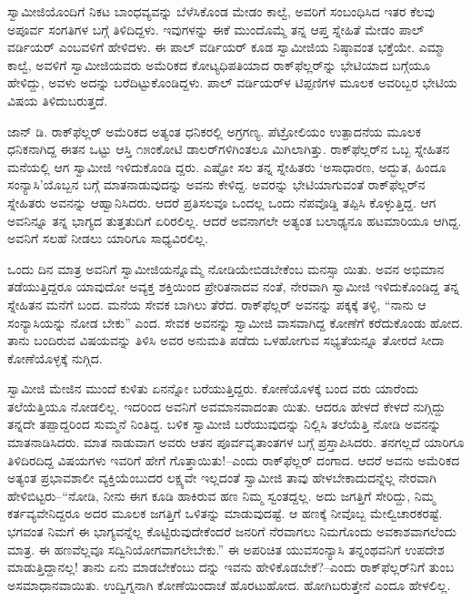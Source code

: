 ಸ್ವಾಮೀಜಿಯೊಂದಿಗೆ ನಿಕಟ ಬಾಂಧವ್ಯವನ್ನು ಬೆಳೆಸಿಕೊಂಡ ಮೇಡಂ ಕಾಲ್ವೆ, ಅವರಿಗೆ ಸಂಬಂಧಿಸಿದ ಇತರ ಕೆಲವು ಅಪೂರ್ವ ಸಂಗತಿಗಳ ಬಗ್ಗೆ ತಿಳಿದಿದ್ದಳು. ಇವುಗಳನ್ನು ಈಕೆ ಮುಂದೊಮ್ಮೆ ತನ್ನ ಆಪ್ತ ಸ್ನೇಹಿತೆ ಮೇಡಂ ಪಾಲ್ ವರ್ಡಿಯರ್ ಎಂಬವಳಿಗೆ ಹೇಳಿದಳು. ಈ ಪಾಲ್ ವರ್ಡಿಯರ್ ಕೂಡ ಸ್ವಾಮೀಜಿಯ ನಿಷ್ಠಾವಂತ ಭಕ್ತೆಯೇ. ಎಮ್ಮಾ ಕಾಲ್ವೆ, ಅವಳಿಗೆ ಸ್ವಾಮೀಜಿಯವರು ಅಮೆರಿಕದ ಕೋಟ್ಯಧಿಪತಿಯಾದ ರಾಕ್​ಫೆಲ್ಲರ್​ನ್ನು ಭೇಟಿಯಾದ ಬಗ್ಗೆಯೂ ಹೇಳಿದ್ದು, ಅವಳು ಅದನ್ನು ಬರೆದಿಟ್ಟುಕೊಂಡಿದ್ದಳು. ಪಾಲ್ ವರ್ಡಿಯರ್​ಳ ಟಿಪ್ಪಣಿಗಳ ಮೂಲಕ ಅವರಿಬ್ಬರ ಭೇಟಿಯ ವಿಷಯ ತಿಳಿದುಬರುತ್ತದೆ.

ಜಾನ್ ಡಿ. ರಾಕ್​ಫೆಲ್ಲರ್ ಅಮೆರಿಕದ ಅತ್ಯಂತ ಧನಿಕರಲ್ಲಿ ಅಗ್ರಗಣ್ಯ. ಪೆಟ್ರೋಲಿಯಂ ಉತ್ಪಾದನೆಯ ಮೂಲಕ ಧನಿಕನಾಗಿದ್ದ ಈತನ ಒಟ್ಟು ಆಸ್ತಿ ೧೫ಂಕೋಟಿ ಡಾಲರ್​ಗಳಿಗಿಂತಲೂ ಮಿಗಿಲಾಗಿತ್ತು. ರಾಕ್​ಫೆಲ್ಲರ್​ನ ಒಬ್ಬ ಸ್ನೇಹಿತನ ಮನೆಯಲ್ಲಿ ಆಗ ಸ್ವಾಮೀಜಿ ಇಳಿದುಕೊಂಡಿ ದ್ದರು. ಎಷ್ಟೋ ಸಲ ತನ್ನ ಸ್ನೇಹಿತರು ‘ಅಸಾಧಾರಣ, ಅದ್ಭುತ, ಹಿಂದೂ ಸಂನ್ಯಾಸಿ’ಯೊಬ್ಬನ ಬಗ್ಗೆ ಮಾತನಾಡುವುದನ್ನು ಅವನು ಕೇಳಿದ್ದ. ಅವರನ್ನು ಭೇಟಿಯಾಗುವಂತೆ ರಾಕ್​ಫೆಲ್ಲರ್​ನ ಸ್ನೇಹಿತರು ಅವನನ್ನು ಆಹ್ವಾನಿಸಿದರು. ಆದರೆ ಪ್ರತಿಸಲವೂ ಒಂದಲ್ಲ ಒಂದು ನೆಪವೊಡ್ಡಿ ತಪ್ಪಿಸಿ ಕೊಳ್ಳುತ್ತಿದ್ದ. ಆಗ ಅವನಿನ್ನೂ ತನ್ನ ಭಾಗ್ಯದ ತುತ್ತತುದಿಗೆ ಏರಿರಲಿಲ್ಲ. ಆದರೆ ಅವನಾಗಲೇ ಅತ್ಯಂತ ಬಲಾಢ್ಯನೂ ಹಟಮಾರಿಯೂ ಆಗಿದ್ದ. ಅವನಿಗೆ ಸಲಹೆ ನೀಡಲು ಯಾರಿಗೂ ಸಾಧ್ಯವಿರಲಿಲ್ಲ.

ಒಂದು ದಿನ ಮಾತ್ರ ಅವನಿಗೆ ಸ್ವಾಮೀಜಿಯನ್ನೊಮ್ಮೆ ನೋಡಿಯೇಬಿಡಬೇಕೆಂಬ ಮನಸ್ಸಾ ಯಿತು. ಅವನ ಅಭಿಮಾನ ತಡೆಯುತ್ತಿದ್ದರೂ ಯಾವುದೋ ಅವ್ಯಕ್ತ ಶಕ್ತಿಯಿಂದ ಪ್ರೇರಿತನಾದವ ನಂತೆ, ನೇರವಾಗಿ ಸ್ವಾಮೀಜಿ ಇಳಿದುಕೊಂಡಿದ್ದ ತನ್ನ ಸ್ನೇಹಿತನ ಮನೆಗೆ ಬಂದ. ಮನೆಯ ಸೇವಕ ಬಾಗಿಲು ತೆರೆದ. ರಾಕ್​ಫೆಲ್ಲರ್ ಅವನನ್ನು ಪಕ್ಕಕ್ಕೆ ತಳ್ಳಿ, “ನಾನು ಆ ಸಂನ್ಯಾಸಿಯನ್ನು ನೋಡ ಬೇಕು” ಎಂದ. ಸೇವಕ ಅವನನ್ನು ಸ್ವಾಮೀಜಿ ವಾಸವಾಗಿದ್ದ ಕೋಣೆಗೆ ಕರೆದುಕೊಂಡು ಹೋದ. ತಾನು ಬಂದಿರುವ ವಿಷಯವನ್ನು ತಿಳಿಸಿ ಅವರ ಅನುಮತಿ ಪಡೆದು ಒಳಹೋಗುವ ಸಭ್ಯತೆಯನ್ನೂ ತೋರದೆ ಸೀದಾ ಕೋಣೆಯೊಳ್ಳಕ್ಕೆ ನುಗ್ಗಿದ.

ಸ್ವಾಮೀಜಿ ಮೇಜಿನ ಮುಂದೆ ಕುಳಿತು ಏನನ್ನೋ ಬರೆಯುತ್ತಿದ್ದರು. ಕೋಣೆಯೊಳಕ್ಕೆ ಬಂದ ವರು ಯಾರೆಂದು ತಲೆಯೆತ್ತಿಯೂ ನೋಡಲಿಲ್ಲ. ಇದರಿಂದ ಅವನಿಗೆ ಅವಮಾನವಾದಂತಾ ಯಿತು. ಆದರೂ ಹೇಳದೆ ಕೇಳದೆ ನುಗ್ಗಿದ್ದು ತನ್ನದೇ ತಪ್ಪಾದ್ದರಿಂದ ಸುಮ್ಮನೆ ನಿಂತಿದ್ದ. ಬಳಿಕ ಸ್ವಾಮೀಜಿ ಬರೆಯುವುದನ್ನು ನಿಲ್ಲಿಸಿ ತಲೆಯೆತ್ತಿ ನೋಡಿ ಅವನನ್ನು ಮಾತನಾಡಿಸಿದರು. ಮಾತ ನಾಡುವಾಗ ಅವರು ಆತನ ಪೂರ್ವವೃತಾಂತಗಳ ಬಗ್ಗೆ ಪ್ರಸ್ತಾಪಿಸಿದರು. ತನಗಲ್ಲದೆ ಯಾರಿಗೂ ತಿಳಿದಿರದಿದ್ದ ವಿಷಯಗಳು ಇವರಿಗೆ ಹೇಗೆ ಗೊತ್ತಾಯಿತು!–ಎಂದು ರಾಕ್​ಫೆಲ್ಲರ್ ದಂಗಾದ. ಆದರೆ ಅವನು ಅಮೆರಿಕದ ಅತ್ಯಂತ ಪ್ರಭಾವಶಾಲೀ ವ್ಯಕ್ತಿಯೆಂಬುದರ ಲಕ್ಷ್ಯವೇ ಇಲ್ಲದಂತೆ ಸ್ವಾಮೀಜಿ ತಾವು ಹೇಳಬೇಕಾದುದನ್ನೆಲ್ಲ ನೇರವಾಗಿ ಹೇಳಿಬಿಟ್ಟರು–“ನೋಡಿ, ನೀನು ಈಗ ಕೂಡಿ ಹಾಕಿರುವ ಹಣ ನಿಮ್ಮ ಸ್ವಂತದ್ದಲ್ಲ. ಅದು ಜಗತ್ತಿಗೆ ಸೇರಿದ್ದು, ನಿಮ್ಮ ಕರ್ತವ್ಯವೇನಿದ್ದರೂ ಅದರ ಮೂಲಕ ಜಗತ್ತಿಗೆ ಒಳಿತನ್ನು ಮಾಡುವುದಷ್ಟೆ. ಆ ಹಣಕ್ಕೆ ನೀವೊಬ್ಬ ಮೇಲ್ವಿಚಾರಕರಷ್ಟೆ. ಭಗವಂತ ನಿಮಗೆ ಈ ಭಾಗ್ಯವನ್ನೆಲ್ಲ ಕೊಟ್ಟಿರುವುದೇಕೆಂದರೆ ಜನರಿಗೆ ನೆರವಾಗಲು ನಿಮಗೊಂದು ಅವಕಾಶವಾಗಲೆಂದು ಮಾತ್ರ. ಈ ಹಣವೆಲ್ಲವೂ ಸದ್ವಿನಿಯೋಗವಾಗಲೇಬೇಕು.” ಈ ಅಪರಿಚಿತ ಯುವಸಂನ್ಯಾಸಿ ತನ್ನಂಥವನಿಗೆ ಉಪದೇಶ ಮಾಡುತ್ತಿದ್ದಾನಲ್ಲ! ತಾನು ಏನು ಮಾಡಬೇಕೆಂಬು ದನ್ನು ಇವನು ಹೇಳಿಕೊಡಬೇಕೆ?–ಎಂದು ರಾಕ್​ಫೆಲ್ಲರ್​ನಿಗೆ ತುಂಬ ಅಸಮಾಧಾನವಾಯಿತು. ಉದ್ವಿಗ್ನನಾಗಿ ಕೋಣೆಯಿಂದಾಚೆ ಹೊರಟುಹೋದ. ಹೋಗಿಬರುತ್ತೇನೆ ಎಂದೂ ಹೇಳಲಿಲ್ಲ.

